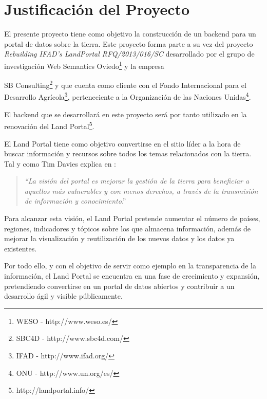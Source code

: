\section{Justificación del Proyecto}
El presente proyecto tiene como objetivo la construcción de un backend para un portal de datos sobre la tierra.  Este proyecto forma parte a su vez del proyecto \textit{Rebuilding IFAD's LandPortal RFQ/2013/016/SC} desarrollado por el grupo de investigación Web Semantics Oviedo\footnote{WESO - http://www.weso.es/} y la empresa {SB Consulting\footnote{SBC4D - http://www.sbc4d.com/} y que cuenta como cliente con el Fondo Internacional para el Desarrollo Agrícola\footnote{IFAD - http://www.ifad.org/}, perteneciente a la Organización de las Naciones Unidas\footnote{ONU - http://www.un.org/es/}.

El backend que se desarrollará en este proyecto será por tanto utilizado en la renovación del Land Portal\footnote{http://landportal.info/}.

El Land Portal tiene como objetivo convertirse en el sitio líder a la hora de buscar información y recursos sobre todos los temas relacionados con la tierra. Tal y como Tim Davies explica en :
\begin{quote}
\textit{``La visión del portal es mejorar la gestión de la tierra para beneficiar a aquellos más vulnerables y con menos derechos, a través de la transmisión de información y conocimiento}.''
\end{quote}

Para alcanzar esta visión, el Land Portal pretende aumentar el número de países, regiones, indicadores y tópicos sobre los que almacena información, además de mejorar la visualización y reutilización de los nuevos datos y los datos ya existentes.

Por todo ello, y con el objetivo de servir como ejemplo en la transparencia de la información, el Land Portal se encuentra en una fase de crecimiento y expansión, pretendiendo convertirse en un portal de datos abiertos y contribuir a un desarrollo ágil y visible públicamente.



}
